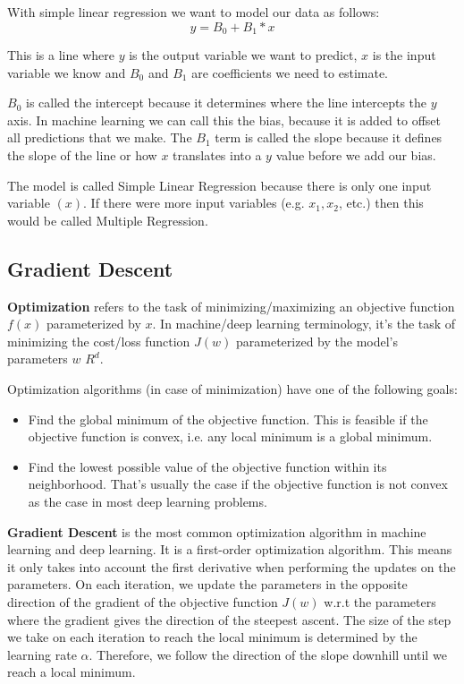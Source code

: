 With simple linear regression we want to model our data as follows:
\[
    y = B_{0} + B_{1} * x
\]

This is a line where $y$ is the output variable we want to predict, $x$ is the input variable we know and $B_{0}$ and $B_{1}$ are coefficients we need to estimate.

$B_{0}$ is called the intercept because it determines where the line intercepts the $y$ axis. In machine learning we can call this the bias, because it is added to offset all predictions that we make. The $B_{1}$ term is called the slope because it defines the slope of the line or how $x$ translates into a $y$ value before we add our bias.

The model is called Simple Linear Regression because there is only one input variable $(x)$. If there were more input variables (e.g. $x_{1}, x_{2}$, etc.) then this would be called Multiple Regression.

\pagebreak

\subsection{Gradient Descent}

\textbf{Optimization} refers to the task of minimizing/maximizing an objective function $f(x)$ parameterized by $x$. In machine/deep learning terminology, it’s the task of minimizing the cost/loss function $J(w)$ parameterized by the model’s parameters $w$ \epsilon $R^d$.

Optimization algorithms (in case of minimization) have one of the following goals:
\begin{itemize}
    \item Find the global minimum of the objective function. This is feasible if the objective function is convex, i.e. any local minimum is a global minimum.
    \item Find the lowest possible value of the objective function within its neighborhood. That’s usually the case if the objective function is not convex as the case in most deep learning problems.
\end{itemize}

\textbf{Gradient Descent} is the most common optimization algorithm in machine learning and deep learning. It is a first-order optimization algorithm. This means it only takes into account the first derivative when performing the updates on the parameters. On each iteration, we update the parameters in the opposite direction of the gradient of the objective function $J(w)$ w.r.t the parameters where the gradient gives the direction of the steepest ascent. The size of the step we take on each iteration to reach the local minimum is determined by the learning rate $α$. Therefore, we follow the direction of the slope downhill until we reach a local minimum.

